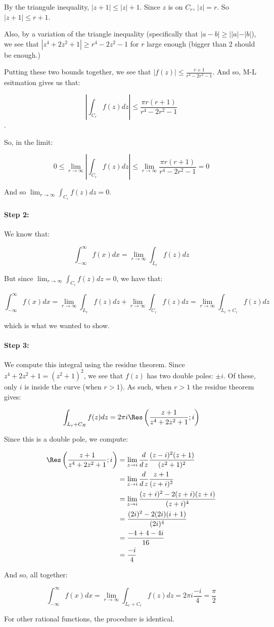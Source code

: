 \begin{ex}{}{}
By the triangule inequality, $|z+1| \le |z| + 1$. Since $z$ is on $C_r$, $|z| = r$. So $|z+1| \le r+1$.

Also, by a variation of the triangle inequality (specifically that $|a-b| \ge ||a|-|b|$), we see that $|z^4+2z^2+1| \ge r^4 - 2z^2 - 1$ for $r$ large enough (bigger than 2 should be enough.)

Putting these two bounds together, we see that $|f(z)| \le \frac{r+1}{r^4 - 2r^2 - 1}$. And so, M-L esitmation gives us that:

$$\left| \int_{C_r} f(z)dz \right| \le \frac{\pi r(r+1)}{r^4 - 2r^2 -1}$$.

So, in the limit:

$$0 \le \lim_{r\rightarrow \infty} \left| \int_{C_r} f(z)dz \right| \le \lim_{r\rightarrow \infty}\frac{\pi r(r+1)}{r^4 - 2r^2 -1} = 0$$

And so $\lim_{r\rightarrow \infty} \int_{C_r} f(z)dz = 0$.

\paragraph{Step 2:} We know that:

$$\int_{-\infty}^\infty f(x)dx = \lim_{r\rightarrow \infty} \int_{L_r}f(z)dz$$

But since $ \lim_{r\rightarrow \infty} \int_{C_r}f(z)dz = 0$, we have that:

$$\int_{-\infty}^\infty f(x)dx = \lim_{r\rightarrow \infty} \int_{L_r}f(z)dz + \lim_{r\rightarrow \infty} \int_{C_r}f(z)dz =\lim_{r\rightarrow \infty} \int_{L_r+C_r}f(z)dz$$

\noin which is what we wanted to show.

\paragraph{Step 3:} We compute this integral using the residue theorem. Since $z^4+2z^2 + 1 = (z^2+1)^2$, we see that $f(z)$ has two double poles: $\pm i$. Of these, only $i$ is inside the curve (when $r > 1$). As such, when $r > 1$ the residue theorem gives:

$$\int_{L_r + C_R} f(z)dz = 2\pi i \Res\left(\frac{z+1}{z^4+2z^2 +1}; i\right)$$

Since this is a double pole, we compute:

\begin{align*}\Res\left(\frac{z+1}{z^4+2z^2 +1}; i\right) &= \lim_{z\rightarrow i} \frac{d}{d\,z} \frac{(z-i)^2(z+1)}{(z^2+1)^2}\\
&= \lim_{z\rightarrow i} \frac{d}{d\,z} \frac{z+1}{(z+i)^2}\\
&= \lim_{z\rightarrow i} \frac{(z+i)^2 -2(z+i)(z+i)}{(z+i)^4}\\
&=\frac{(2i)^2 - 2(2i)(i+1)}{(2i)^4}\\
&= \frac{-4 +4 -4i}{16}\\
&= \frac{-i}{4}
\end{align*}

And so, all together:

$$\int_{-\infty}^\infty f(x)dx = \lim_{r\rightarrow \infty} \int_{L_r+C_r}f(z)dz = 2\pi i\frac{-i}{4} = \frac{\pi}{2}$$

\end{ex}

For other rational functions, the procedure is identical.